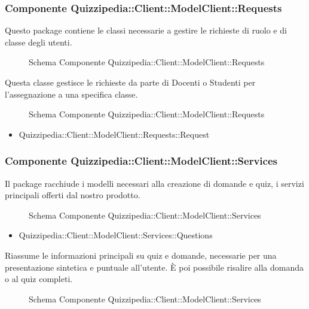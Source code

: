 \subsubsection{Componente Quizzipedia::Client::ModelClient::Requests}
Questo package contiene le classi necessarie a gestire le richieste di ruolo e di classe degli utenti.
\begin{figure}[H]
\centering
\noindent{}
\caption{Schema Componente Quizzipedia::Client::ModelClient::Requests}
\end{figure}
Questa classe gestisce le richieste da parte di Docenti o Studenti per l'assegnazione a una specifica classe.
\begin{figure}[H]
\centering
\noindent{}
\caption{Schema Componente Quizzipedia::Client::ModelClient::Requests}
\end{figure}
\begin{itemize}
\item Quizzipedia::Client::ModelClient::Requests::Request
\end{itemize}
\subsubsection{Componente Quizzipedia::Client::ModelClient::Services}
Il package racchiude i modelli necessari alla creazione di domande e quiz, i servizi principali offerti dal nostro prodotto.
\begin{figure}[H]
\centering
\noindent{}
\caption{Schema Componente Quizzipedia::Client::ModelClient::Services}
\end{figure}
\begin{itemize}
\item Quizzipedia::Client::ModelClient::Services::Questions
\end{itemize}
Riassume le informazioni principali su quiz e domande, necessarie per una presentazione sintetica e puntuale all'utente. È poi possibile risalire alla domanda o al quiz completi.
\begin{figure}[H]
\centering
\noindent{}
\caption{Schema Componente Quizzipedia::Client::ModelClient::Services}
\end{figure}
